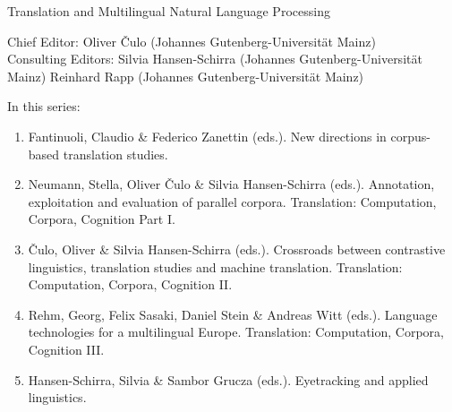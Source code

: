 {\large Translation and Multilingual Natural Language Processing}

\bigskip

Chief Editor: Oliver \v{C}ulo (Johannes Gutenberg-Universität Mainz) \\
Consulting Editors: Silvia Hansen-Schirra (Johannes Gutenberg-Universität Mainz)
Reinhard Rapp (Johannes Gutenberg-Universität Mainz)

\bigskip

In this series:

\begin{enumerate}
\item Fantinuoli, Claudio \& Federico Zanettin (eds.). New directions in corpus-based translation studies.
\item Neumann, Stella, Oliver Čulo \& Silvia Hansen-Schirra (eds.). Annotation, exploitation and evaluation of parallel corpora. Translation: Computation, Corpora, Cognition Part I.
\item Čulo, Oliver  \& Silvia Hansen-Schirra (eds.). Crossroads between contrastive linguistics, translation studies and machine translation. Translation: Computation, Corpora, Cognition II.
\item Rehm, Georg, Felix Sasaki, Daniel Stein \& Andreas Witt (eds.). Language technologies for a multilingual Europe. Translation: Computation, Corpora, Cognition III.
\item Hansen-Schirra, Silvia \& Sambor Grucza (eds.). Eyetracking and applied linguistics.
\end{enumerate}

 
